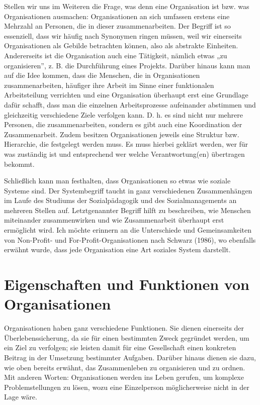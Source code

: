 \documentclass[
  letterpaper,
]{book}
\begin{document}
Stellen wir uns im Weiteren die Frage, was denn eine Organisation ist
bzw. was Organisationen ausmachen: Organisationen an sich umfassen
erstens eine Mehrzahl an Personen, die in dieser zusammenarbeiten. Der
Begriff ist so essenziell, dass wir häufig nach Synonymen ringen müssen,
weil wir einerseits Organisationen als Gebilde betrachten können, also
als abstrakte Einheiten. Andererseits ist die Organisation auch eine
Tätigkeit, nämlich etwas „zu organisieren'', z. B. die Durchführung
eines Projekts. Darüber hinaus kann man auf die Idee kommen, dass die
Menschen, die in Organisationen zusammenarbeiten, häufiger ihre Arbeit
im Sinne einer funktionalen Arbeitsteilung verrichten und eine
Organisation überhaupt erst eine Grundlage dafür schafft, dass man die
einzelnen Arbeitsprozesse aufeinander abstimmen und gleichzeitig
verschiedene Ziele verfolgen kann. D. h. es sind nicht nur mehrere
Personen, die zusammenarbeiten, sondern es gibt auch eine Koordination
der Zusammenarbeit. Zudem besitzen Organisationen jeweils eine Struktur
bzw. Hierarchie, die festgelegt werden muss. Es muss hierbei geklärt
werden, wer für was zuständig ist und entsprechend wer welche
Verantwortung(en) übertragen bekommt.

Schließlich kann man festhalten, dass Organisationen so etwas wie
soziale Systeme sind. Der Systembegriff taucht in ganz verschiedenen
Zusammenhängen im Laufe des Studiums der Sozialpädagogik und des
Sozialmanagements an mehreren Stellen auf. Letztgenannter Begriff hilft
zu beschreiben, wie Menschen miteinander zusammenwirken und wie
Zusammenarbeit überhaupt erst ermöglicht wird. Ich möchte erinnern an
die Unterschiede und Gemeinsamkeiten von Non-Profit- und
For-Profit-Organisationen nach Schwarz (1986), wo ebenfalls erwähnt
wurde, dass jede Organisation eine Art soziales System darstellt.

\section{Eigenschaften und Funktionen von
Organisationen}\label{eigenschaften-und-funktionen-von-organisationen}

Organisationen haben ganz verschiedene Funktionen. Sie dienen einerseits
der Überlebenssicherung, da sie für einen bestimmten Zweck gegründet
werden, um ein Ziel zu verfolgen; sie leisten damit für eine
Gesellschaft einen konkreten Beitrag in der Umsetzung bestimmter
Aufgaben. Darüber hinaus dienen sie dazu, wie oben bereits erwähnt, das
Zusammenleben zu organisieren und zu ordnen. Mit anderen Worten:
Organisationen werden ins Leben gerufen, um komplexe Problemstellungen
zu lösen, wozu eine Einzelperson möglicherweise nicht in der Lage wäre.
\end{document}
